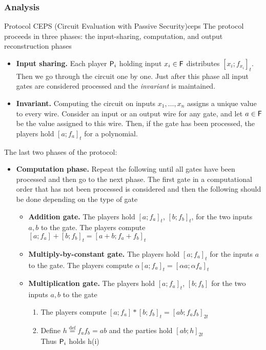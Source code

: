 \subsubsection{Analysis}
\begin{protocol}{Protocol CEPS (Circuit Evaluation with Passive Security)}{ceps}
  The protocol proceeds in three phases: the input-sharing, computation, and output reconstruction phases
  \begin{itemize}
  	\item \textbf{Input sharing.} Each player $\P_i$ holding input $x_i \in \F$ distributes $[x_i; f_{x_i}]_t$. Then we go through the circuit one by one. Just after this phase all input gates are considered processed and the \textit{invariant} is maintained.
  	\item \textbf{Invariant.} Computing the circuit on inputs $x_1, \dots, x_n$ assigns a unique value to every wire. Consider an input or an output wire for any gate, and let $a \in \F$ be the value assigned to this wire. Then, if the gate has been processed, the players hold $[a;f_a]_t$ for a polynomial.
  \end{itemize}
  The last two phases of the protocol:
  \begin{itemize}
  	\item \textbf{Computation phase.} Repeat the following until all gates have been processed and then go to the next phase. The first gate in a computational order that has not been processed is considered and then the following should be done depending on the type of gate
    \begin{itemize}
    	\item \textbf{Addition gate.} The players hold $[a;f_a]_t$, $[b;f_b]_t$, for the two inputs $a,b$ to the gate. The players compute $[a;f_a] + [b;f_b]_t = [a+b;f_a+f_b]_t$
    	\item \textbf{Multiply-by-constant gate.} The players hold $[a;f_a]_t$ for the inputs $a$ to the gate. The players compute $\alpha[a;f_a]_t = [\alpha a; \alpha f_a]_t$
    	\item \textbf{Multiplication gate.} The players hold $[a;f_a]_t$, $[b;f_b]$ for the two inputs $a,b$ to the gate
      \begin{enumerate}
      	\item The players compute $[a;f_a] * [b;f_b]_t = [ab;f_af_b]_{2t}$
        \item Define $h \stackrel{\text{def}}{=} f_af_b = ab$ and the parties hold $[ab;h]_{2t}$ \\ 
        Thus $\P_i$ holds h(i) \\

\end{enumerate}
\end{itemize}
\end{itemize}
\end{protocol}
